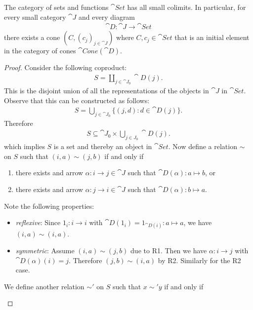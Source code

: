 \documentclass{article}
\begin{document}
\begin{claim*}
   The category of sets and functions $\cat{Set}$ has all small colimits.
   In particular, for every small category $\cat J$ and every diagram
   \begin{align*}
      \cat D : \cat J \to \cat{Set}
   \end{align*}
   there exists a cone $(C, (c_j)_{j\in\cat J})$ where $C,c_j\in\cat{Set}$
   that is an initial element in the category of cones $\cat{Cone}(\cat D)$.
\end{claim*}

\begin{proof}
   Consider the following coproduct:
   \begin{align*}
      S = \coprod_{j\in\cat J_0} \cat D(j).
   \end{align*}
   This is the disjoint union of all the representations of the objects in $\cat J$
   in $\cat{Set}$. Observe that this can be constructed as follows:
   \begin{align*}
      S = \bigcup_{j\in\cat J_0}\{(j, d) : d \in \cat D(j)\}.
   \end{align*}
   Therefore
   \begin{align*}
      S \subseteq \cat J_0 \times \bigcup_{j\in J_0} \cat D(j).
   \end{align*}
   which implies $S$ is a set and thereby an object in $\cat{Set}$.
   Now define a relation $\sim$ on $S$
   such that $(i,a)\sim (j,b)$ if and only if
   \begin{enumerate}[label=R\arabic*.]
      \item there exists and arrow $\alpha:i\to j\in\cat J$ such that $\cat D(\alpha): a \mapsto b$, or
      \item there exists and arrow $\alpha:j\to i\in\cat J$ such that $\cat D(\alpha): b \mapsto a$.
   \end{enumerate}
   Note the following properties:
   \begin{itemize}
      \item \emph{reflexive}: Since $1_i:i\to i$ with $\cat D(1_i)=1_{\cat D(i)}:a\mapsto a$, we have $(i,a)\sim(i,a)$.
      \item \emph{symmetric}: Assume $(i,a)\sim(j,b)$ due to R1. Then we have $\alpha:i\to j$ with $\cat D(\alpha)(i) = j$.
            Therefore $(j,b)\sim (i,a)$ by R2. Similarly for the R2 case.
   \end{itemize}
   We define another relation $\sim'$ on $S$ such that $x\sim'y$ if and only if
   \begin{enumerate}[label=E\arabic*.]

\end{enumerate}
\end{proof}
\end{document}
